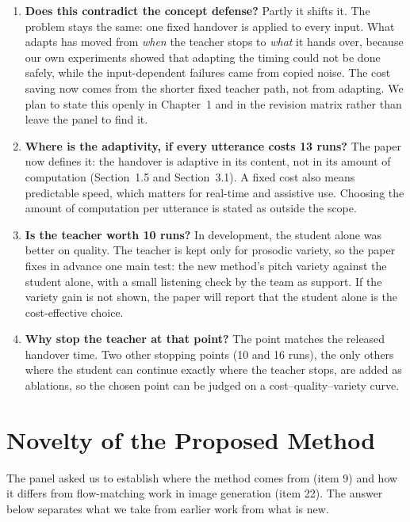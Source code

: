 \documentclass[11pt,a4paper]{article}
\newcommand{\st}[1]{\textbf{#1}}
\begin{document}
\begin{enumerate}
\item \st{Does this contradict the concept defense?} Partly it shifts it. The problem stays the same: one fixed handover is applied to every input. What adapts has moved from \emph{when} the teacher stops to \emph{what} it hands over, because our own experiments showed that adapting the timing could not be done safely, while the input-dependent failures came from copied noise. The cost saving now comes from the shorter fixed teacher path, not from adapting. We plan to state this openly in Chapter~1 and in the revision matrix rather than leave the panel to find it.
\item \st{Where is the adaptivity, if every utterance costs 13 runs?} The paper now defines it: the handover is adaptive in its content, not in its amount of computation (Section~1.5 and Section~3.1). A fixed cost also means predictable speed, which matters for real-time and assistive use. Choosing the amount of computation per utterance is stated as outside the scope.
\item \st{Is the teacher worth 10 runs?} In development, the student alone was better on quality. The teacher is kept only for prosodic variety, so the paper fixes in advance one main test: the new method's pitch variety against the student alone, with a small listening check by the team as support. If the variety gain is not shown, the paper will report that the student alone is the cost-effective choice.
\item \st{Why stop the teacher at that point?} The point matches the released handover time. Two other stopping points (10 and 16 runs), the only others where the student can continue exactly where the teacher stops, are added as ablations, so the chosen point can be judged on a cost--quality--variety curve.
\end{enumerate}

\section{Novelty of the Proposed Method}
\label{sec:novelty}

The panel asked us to establish where the method comes from (item 9) and how it differs from flow-matching work in image generation (item 22). The answer below separates what we take from earlier work from what is new.
\end{document}
